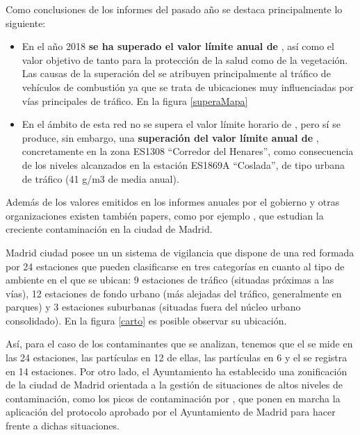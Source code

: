   Como conclusiones de los informes del pasado año se destaca principalmente lo siguiente:
 
 \begin{itemize}
 	\item En el año 2018 \textbf{se ha superado el valor límite anual de }, así como el valor objetivo de  tanto para la protección de la salud como de la vegetación.	Las causas de la superación del  se atribuyen principalmente al tráfico de vehículos de	combustión ya que se trata de ubicaciones muy influenciadas por vías principales de tráfico. En la figura \ref{superaMapa}
 	\item En el ámbito de esta red no se supera el valor límite horario de , pero sí se produce, sin embargo, una \textbf{superación del valor límite anual de }, concretamente en la zona ES1308 “Corredor del Henares”, como consecuencia de los niveles alcanzados en la estación ES1869A “Coslada”, de tipo urbana de tráfico (41 \textmugreek g/m3 de media anual).
 \end{itemize}



Además de los valores emitidos en los informes anuales por el gobierno y otras organizaciones existen también papers, como por ejemplo \cite{nunez-alonso_statistical_2019} \cite{gomez-losada_data_2019}, que estudian la creciente contaminación en la ciudad de Madrid.
 
 Madrid ciudad posee un un sistema de vigilancia que dispone de una red formada por 24 estaciones que pueden clasificarse en tres categorías en cuanto al tipo de ambiente en el que se ubican: 9 estaciones de tráfico (situadas próximas a las vías), 12 estaciones de fondo urbano (más alejadas del tráfico, generalmente en parques) y 3 estaciones suburbanas (situadas fuera del núcleo urbano consolidado). En la figura \ref{carto} es posible observar su ubicación.
 

 Así, para el caso de los contaminantes que se analizan, tenemos que el  se mide en las 24 estaciones, las partículas  en 12 de ellas, las partículas  en 6 y el  se registra en 14 estaciones. Por otro lado, el Ayuntamiento ha establecido una zonificación de la ciudad de Madrid orientada a la gestión de situaciones de altos niveles de contaminación, como los picos de contaminación por , que ponen en marcha la aplicación del protocolo aprobado por el Ayuntamiento de Madrid para hacer frente a dichas situaciones.
 
